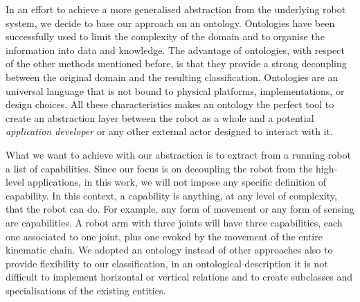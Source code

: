 In an effort to achieve a more generalised abstraction from the underlying robot system, we decide to base our approach on an ontology. Ontologies have been successfully used to limit the complexity of the domain and to organise the information into data and knowledge. The advantage of ontologies, with respect of the other methods mentioned before, is that they provide a strong decoupling between the original domain and the resulting classification. Ontologies are an universal language that is not bound to physical platforms, implementations, or design choices. All these characteristics makes an ontology the perfect tool to create an abstraction layer between the robot as a whole and a potential \textit{application developer} or any other external actor designed to interact with it. 

What we want to achieve with our abstraction is to extract from a running robot a list of capabilities. Since our focus is on decoupling the robot from the high-level applications, in this work, we will not impose any specific definition of capability. In this context, a capability is anything, at any level of complexity, that the robot can do. For example, any form of movement or any form of sensing are capabilities. A robot arm with three joints will have three capabilities, each one associated to one joint, plus one evoked by the movement of the entire kinematic chain. We adopted an ontology instead of other approaches also to provide flexibility to our classification, in an ontological description it is not difficult to implement horizontal or vertical relations and to create subclasses and specialisations of the existing entities. 

